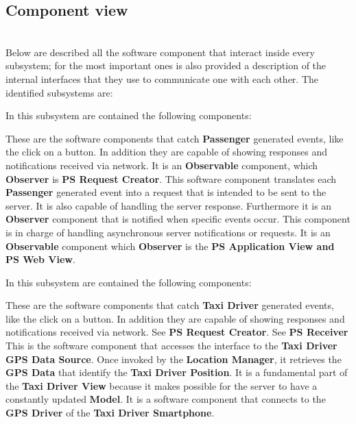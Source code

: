 \subsection{Component view}
\\
Below are described all the software component that interact inside every subsystem; for the most important ones is also provided a description of the internal interfaces that they use to communicate one with each other.
The identified subsystems are:
\begin{itemize}
	In this subsystem are contained the following components:
	\begin{itemize}
		 These are the software components that catch \textbf{Passenger} generated events, like the click on a button. In addition they are capable of showing responses and notifications received via network.
		It is an \textbf{Observable} component, which \textbf{Observer} is \textbf{PS Request Creator}.
		 This software component translates each \textbf{Passenger} generated event into a request that is intended to be sent to the server.
		It is also capable of handling the server response.
		Furthermore it is an \textbf{Observer} component that is notified when specific events occur.
		 This component is in charge of handling asynchronous server notifications or requests.
		It is an \textbf{Observable} component which \textbf{Observer} is the \textbf{PS Application View and PS Web View}.
	\end{itemize}
	\itemBold{Taxi Driver View}
	In this subsystem are contained the following components:
	\begin{itemize}
		 These are the software components that catch \textbf{Taxi Driver} generated events, like the click on a button. In addition they are capable of showing responses and notifications received via network.
		 See \textbf{PS Request Creator}.
		 See \textbf{PS Receiver}
		 This is the software component that accesses the interface to the \textbf{Taxi Driver GPS Data Source}. Once invoked by the \textbf{Location Manager}, it retrieves the \textbf{GPS Data} that identify the \textbf{Taxi Driver Position}. It is a fundamental part of the \textbf{Taxi Driver View} because it makes possible for the server to have a constantly updated \textbf{Model}.
		 It is a software component that connects to the \textbf{GPS Driver} of the \textbf{Taxi Driver Smartphone}.

\end{itemize}
\end{itemize}
